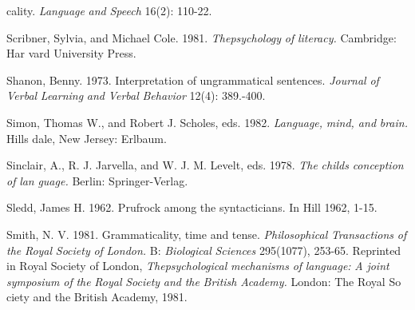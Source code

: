 \begin{styleStandard}
cality. \textit{Language}\textit{ }\textit{and}\textit{ }\textit{Speech}\textit{ }16(2): 110-22.
\end{styleStandard}


\begin{styleStandard}
Scribner, Sylvia, and Michael Cole. 1981. \textit{Th}\textit{e}\textit{psychology}\textit{ }\textit{of}\textit{ }\textit{literacy.}\textit{ }Cambridge: Har\- vard University Press.
\end{styleStandard}


\begin{styleStandard}
Shanon, Benny. 1973. Interpretation of ungrammatical sentences. \textit{Journal}\textit{ }\textit{of}\textit{ }\textit{Verbal}\textit{ }\textit{Learning}\textit{ }\textit{and}\textit{ }\textit{Verbal}\textit{ }\textit{Behavior}\textit{ }12(4): 389.{}-400.
\end{styleStandard}


\begin{styleStandard}
Simon, Thomas W., and Robert J. Scholes, eds. 1982. \textit{Language,}\textit{ }\textit{mind, and}\textit{ }\textit{brain.}\textit{ }Hills\- dale, New Jersey: Erlbaum.
\end{styleStandard}


\begin{styleStandard}
Sinclair, A., R. J. Jarvella, and W. J. M. Levelt, eds. 1978. \textit{The}\textit{ }\textit{child{\textquotesingle}s}\textit{ }\textit{conception}\textit{ }\textit{of}\textit{ }\textit{lan\-}\textit{ }\textit{guage.}\textit{ }Berlin: Springer-Verlag.
\end{styleStandard}


\begin{styleStandard}
Sledd, James H. 1962. Prufrock among the syntacticians. In Hill 1962, 1-15.
\end{styleStandard}


\begin{styleStandard}
Smith, N. V. 1981. Grammaticality, time and tense. \textit{Philosophical}\textit{ }\textit{Transactions}\textit{ }\textit{of}\textit{ }\textit{the}\textit{ }\textit{Royal}\textit{ }\textit{Society}\textit{ }\textit{of}\textit{ }\textit{London.}\textit{ }B: \textit{Biological}\textit{ }\textit{Sciences}\textit{ }295(1077), 253-65. Reprinted in Royal Society of London, \textit{Th}\textit{e}\textit{psychological}\textit{ }\textit{mechanisms}\textit{ }\textit{of}\textit{ }\textit{language:}\textit{ }\textit{A}\textit{ }\textit{joint}\textit{ }\textit{symposium}\textit{ }\textit{of}\textit{ }\textit{the}\textit{ }\textit{Royal}\textit{ }\textit{Society}\textit{ }\textit{and}\textit{ }\textit{the}\textit{ }\textit{British}\textit{ }\textit{Academy.}\textit{ }London: The Royal So\- ciety and the British Academy, 1981.
\end{styleStandard}


